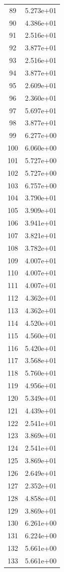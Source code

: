 \documentclass[12pt]{article}
\begin{document}
\begin{longtable}{@{}cc@{}}
89 & 5.273e+01 \\
90 & 4.386e+01 \\
91 & 2.516e+01 \\
92 & 3.877e+01 \\
93 & 2.516e+01 \\
94 & 3.877e+01 \\
95 & 2.609e+01 \\
96 & 2.360e+01 \\
97 & 5.697e+01 \\
98 & 3.877e+01 \\
99 & 6.277e+00 \\
100 & 6.060e+00 \\
101 & 5.727e+00 \\
102 & 5.727e+00 \\
103 & 6.757e+00 \\
104 & 3.790e+01 \\
105 & 3.909e+01 \\
106 & 3.941e+01 \\
107 & 3.821e+01 \\
108 & 3.782e+01 \\
109 & 4.007e+01 \\
110 & 4.007e+01 \\
111 & 4.007e+01 \\
112 & 4.362e+01 \\
113 & 4.362e+01 \\
114 & 4.520e+01 \\
115 & 4.560e+01 \\
116 & 5.420e+01 \\
117 & 3.568e+01 \\
118 & 5.760e+01 \\
119 & 4.956e+01 \\
120 & 5.349e+01 \\
121 & 4.439e+01 \\
122 & 2.541e+01 \\
123 & 3.869e+01 \\
124 & 2.541e+01 \\
125 & 3.869e+01 \\
126 & 2.649e+01 \\
127 & 2.352e+01 \\
128 & 4.858e+01 \\
129 & 3.869e+01 \\
130 & 6.261e+00 \\
131 & 6.224e+00 \\
132 & 5.661e+00 \\
133 & 5.661e+00 \\

\end{longtable}
\end{document}
